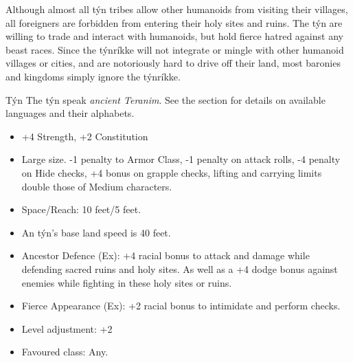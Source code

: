 
Although almost all týn tribes allow other humanoids from visiting their
villages, all foreigners are forbidden from entering their holy sites and
ruins. The týn are willing to trade and interact with humanoids, but hold
fierce hatred against any beast races. Since the týnríkke will not integrate
or mingle with other humanoid villages or cities, and are notoriously hard to
drive off their land, most baronies and kingdoms simply ignore the týnríkke.

\begin{35e}{Týn}
  The týn speak \emph{ancient Teranim}. See the section  for details on available languages and their alphabets.

  \begin{itemize}[noitemsep]
    \item +4 Strength, +2 Constitution
    \item Large size. -1 penalty to Armor Class, -1 penalty on attack rolls,
      -4 penalty on Hide checks, +4 bonus on grapple checks, lifting and
      carrying limits double those of Medium characters.
    \item Space/Reach: 10 feet/5 feet.
    \item An týn's base land speed is 40 feet.
    \item Ancestor Defence (Ex): +4 racial bonus to attack and damage while
      defending sacred ruins and holy sites. As well as a +4 dodge bonus
      against enemies while fighting in these holy sites or ruins.
    \item Fierce Appearance (Ex): +2 racial bonus to intimidate and perform
      checks.
    \item Level adjustment: +2
    \item Favoured class: Any.
  \end{itemize}
\end{35e}
